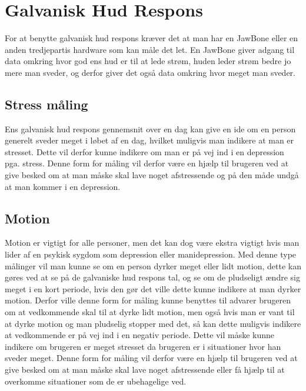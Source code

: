 \section{Galvanisk Hud Respons}
For at benytte galvanisk hud respons kræver det at man har en JawBone eller en anden tredjepartis hardware som kan måle det let.
En JawBone giver adgang til data omkring hvor god ens hud er til at lede strøm, huden leder strøm bedre jo mere man sveder, og derfor giver det også data omkring hvor meget man sveder.

\subsection{Stress måling}
Ens galvanisk hud respons gennemsnit over en dag kan give en ide om en person generelt sveder meget i løbet af en dag, hvilket muligvis man indikere at man er stresset.
Dette vil derfor kunne indikere om man er på vej ind i en depression pga. stress.
Denne form for måling vil derfor være en hjælp til brugeren ved at give besked om at man måske skal lave noget afstressende og på den måde undgå at man kommer i en depression.

\subsection{Motion}
Motion er vigtigt for alle personer, men det kan dog være ekstra vigtigt hvis man lider af en psykisk sygdom som depression eller manidepression.
Med denne type målinger vil man kunne se om en person dyrker meget eller lidt motion, dette kan gøres ved at se på de galvaniske hud respons tal, og se om de pludseligt ændre sig meget i en kort periode, hvis den gør det ville dette kunne indikere at man dyrker motion.
Derfor ville denne form for måling kunne benyttes til advarer brugeren om at vedkommende skal til at dyrke lidt motion, men også hvis man er vant til at dyrke motion og man pludselig stopper med det, så kan dette muligvis indikere at vedkommende er på vej ind i en negativ periode.
Dette vil måske kunne indikere om brugeren er meget stresset da brugeren er i situationer hvor han sveder meget.
Denne form for måling vil derfor være en hjælp til brugeren ved at give besked om at man måske skal lave noget afstressende eller få hjælp til at overkomme situationer som de er ubehagelige ved.

